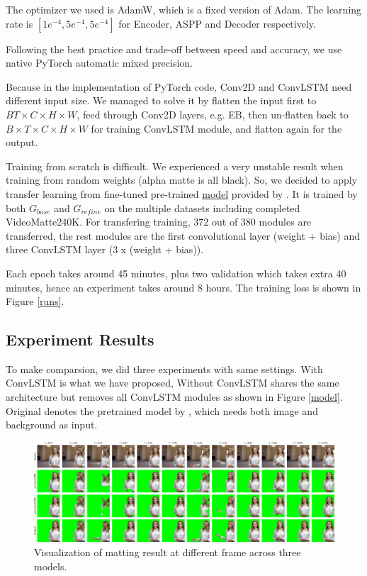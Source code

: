 \documentclass[final]{cvpr}
\begin{document}
The optimizer we used is AdamW, which is a fixed version of Adam.
The learning rate is $[1e^{-4},5e^{-4},5e^{-4}]$ for Encoder, ASPP and Decoder respectively.

Following the best practice and trade-off between speed and accuracy, we use native PyTorch automatic mixed precision.

Because in the implementation of PyTorch code, Conv2D and ConvLSTM need different input size.
We managed to solve it by flatten the input first to $BT\times C\times H \times W$, feed through Conv2D layers, e.g. EB, then un-flatten back to $B\times T\times C\times H \times W$ for training ConvLSTM module, and flatten again for the output.

Training from scratch is difficult.
We experienced a very unstable result when training from random weights (alpha matte is all black).
So, we decided to apply transfer learning from fine-tuned pre-trained \href{https://drive.google.com/drive/folders/1cbetlrKREitIgjnIikG1HdM4x72FtgBh}{model} provided by \cite{linRealTimeHighResolutionBackground2020a}.
It is trained by both $G_{base}$ and $G_{refine}$ on the multiple datasets including completed VideoMatte240K.
For transfering training, $372$ out of $380$ modules are transferred, the rest modules are the first convolutional layer (weight + bias) and three ConvLSTM layer (3 x (weight + bias)).

Each epoch takes around 45 minutes, plus two validation which takes extra 40 minutes, hence an experiment takes around 8 hours.
The training loss is shown in Figure \ref{runs}.

\subsection{Experiment Results}

To make comparsion, we did three experiments with same settings.
With ConvLSTM is what we have proposed, Without ConvLSTM shares the same architecture but removes all ConvLSTM modules as shown in Figure \ref{model}. Original denotes the pretrained model by \cite{linRealTimeHighResolutionBackground2020a}, which needs both image and background as input.

\begin{figure}[htb]
    \begin{center}
        \includegraphics[width=1\textwidth]{img/visual.pdf}
    \end{center}
    \caption{Visualization of matting result at different frame across three models.}
    \label{visual}
\end{figure}
\end{document}
